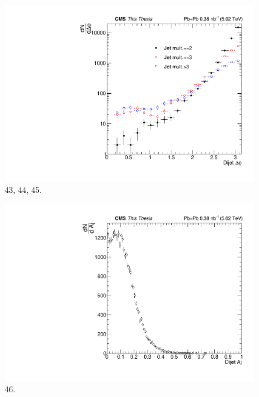 \begin{figure}[h!]
\begin{centering}
\includegraphics[width=5in]{Chapter6/importfigs/43_44_45_thesis.pdf}
\par\end{centering}
\caption{43, 44, 45. \label{fig:43_44_45}}
\end{figure}

\begin{figure}[h!]
\begin{centering}
\includegraphics[width=5in]{Chapter6/importfigs/46_thesis.pdf}
\par\end{centering}
\caption{46. \label{fig:46}}
\end{figure}

